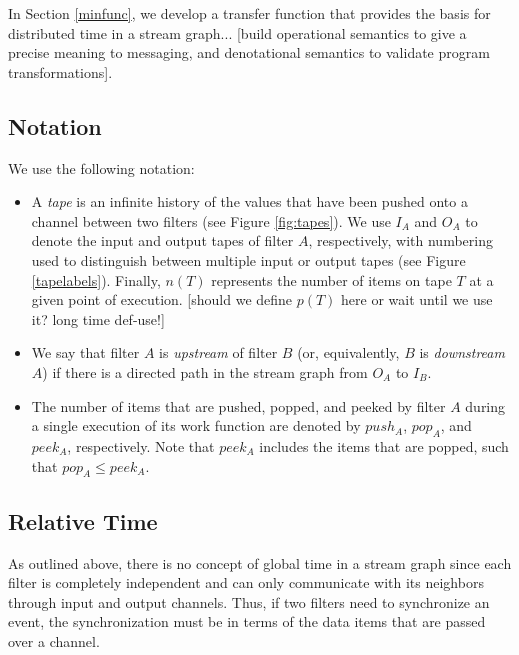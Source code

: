 In Section \ref{minfunc}, we develop a transfer function that provides
the basis for distributed time in a stream graph... [build operational
semantics to give a precise meaning to messaging, and denotational
semantics to validate program transformations].

\subsection{Notation}

We use the following notation:

\begin{itemize}

\item A {\it tape} is an infinite history of the values that have been
  pushed onto a channel between two filters (see Figure
  \ref{fig:tapes}).  We use $I_A$ and $O_A$ to denote the input and
  output tapes of filter $A$, respectively, with numbering used to
  distinguish between multiple input or output tapes (see Figure
  \ref{tapelabels}).  Finally, $n(T)$ represents the number of items
  on tape $T$ at a given point of execution.  [should we define $p(T)$
  here or wait until we use it?  long time def-use!]

\item We say that filter $A$ is {\it upstream} of filter $B$ (or,
  equivalently, $B$ is {\it downstream} $A$) if there is a directed
  path in the stream graph from $O_A$ to $I_B$.

\item The number of items that are pushed, popped, and peeked by
  filter $A$ during a single execution of its work function are
  denoted by $push_A$, $pop_A$, and $peek_A$, respectively.  Note that
  $peek_A$ includes the items that are popped, such that $pop_A \le
  peek_A$.

\end{itemize}

\subsection{Relative Time}
\label{sec:minfunc}

As outlined above, there is no concept of global time in a stream
graph since each filter is completely independent and can only
communicate with its neighbors through input and output channels.
Thus, if two filters need to synchronize an event, the synchronization
must be in terms of the data items that are passed over a channel.

